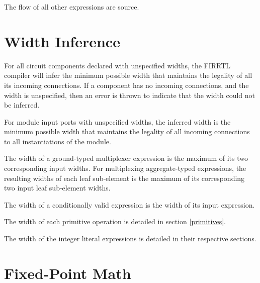 \documentclass[12pt]{article}
\begin{document}
The flow of all other expressions are source.

\section{Width Inference}\label{width_inference}

For all circuit components declared with unspecified widths, the FIRRTL compiler will infer the minimum possible width that maintains the legality of all its incoming connections. If a component has no incoming connections, and the width is unspecified, then an error is thrown to indicate that the width could not be inferred.

For module input ports with unspecified widths, the inferred width is the minimum possible width that maintains the legality of all incoming connections to all instantiations of the module.

The width of a ground-typed multiplexer expression is the maximum of its two corresponding input widths. For multiplexing aggregate-typed expressions, the resulting widths of each leaf sub-element is the maximum of its corresponding two input leaf sub-element widths.

The width of a conditionally valid expression is the width of its input expression.

The width of each primitive operation is detailed in section \ref{primitives}.

The width of the integer literal expressions is detailed in their respective sections.

\section{Fixed-Point Math}\label{fixed_rules}
\end{document}
